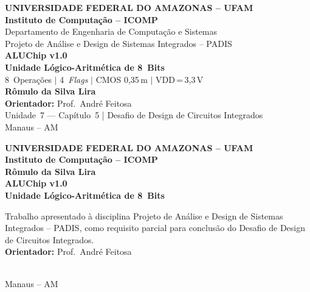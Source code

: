 \documentclass[12pt,a4paper]{article}
\begin{document}
\thispagestyle{empty}

\begin{center}
  \vspace*{0.5cm}
  {\normalsize\bfseries UNIVERSIDADE FEDERAL DO AMAZONAS -- UFAM}\\[3pt]
  {\normalsize\bfseries Instituto de Computação -- ICOMP}\\[3pt]
  {\normalsize Departamento de Engenharia de Computação e Sistemas}\\[3pt]
  {\normalsize Projeto de Análise e Design de Sistemas Integrados -- PADIS}\\[40pt]

  {\LARGE\bfseries\color{alublue} ALUChip v1.0}\\[10pt]
  {\large\bfseries Unidade Lógico-Aritmética de 8~Bits}\\[6pt]
  {\normalsize\color{alugray}
    8~Operações $|$ 4~\textit{Flags} $|$ CMOS 0,35\,\textmu m $|$ VDD\,=\,3,3\,V}\\[40pt]

  {\normalsize\bfseries Rômulo da Silva Lira}\\[60pt]

  \vfill
  {\normalsize\textbf{Orientador:} Prof.\ André Feitosa}\\[6pt]
  {\normalsize Unidade~7 --- Capítulo~5 | Desafio de Design de Circuitos Integrados}\\[6pt]
  {\normalsize Manaus -- AM}\\[4pt]
  {\normalsize \the\year}
\end{center}

\newpage
\thispagestyle{empty}
\begin{center}
  \vspace*{0.5cm}
  {\normalsize\bfseries UNIVERSIDADE FEDERAL DO AMAZONAS -- UFAM}\\[3pt]
  {\normalsize\bfseries Instituto de Computação -- ICOMP}\\[30pt]

  {\normalsize\bfseries Rômulo da Silva Lira}\\[40pt]

  {\LARGE\bfseries\color{alublue} ALUChip v1.0}\\[10pt]
  {\large\bfseries Unidade Lógico-Aritmética de 8~Bits}\\[40pt]

  \begin{minipage}{0.55\textwidth}
  \begin{flushright}
    {\small Trabalho apresentado à disciplina Projeto de Análise e Design de Sistemas Integrados -- PADIS, como requisito parcial para conclusão do Desafio de Design de Circuitos Integrados.}\\[10pt]
    {\small \textbf{Orientador:} Prof.\ André Feitosa}
  \end{flushright}
  \end{minipage}\\[60pt]

  \vfill
  {\normalsize Manaus -- AM}\\[4pt]
  {\normalsize \the\year}
\end{center}
\end{document}
